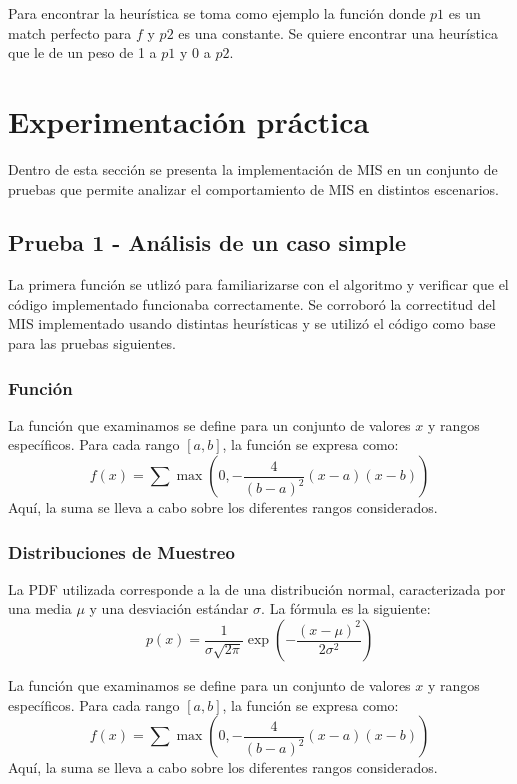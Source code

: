 \documentclass{article}
\begin{document}
Para encontrar la heurística se toma como ejemplo la función donde $p1$ es un match perfecto para $f$ y $p2$ es una constante.
Se quiere encontrar una heurística que le de un peso de 1 a $p1$ y 0 a $p2$.

\section{Experimentación práctica}

Dentro de esta sección se presenta la implementación de MIS en un conjunto de pruebas que permite analizar el comportamiento de MIS en distintos escenarios.

\subsection{Prueba 1 - Análisis de un caso simple}

La primera función se utlizó para familiarizarse con el algoritmo y verificar que el código implementado funcionaba correctamente.
Se corroboró la correctitud del MIS implementado usando distintas heurísticas y se utilizó el código como base para las pruebas siguientes.

\subsubsection*{Función}
La función que examinamos se define para un conjunto de valores \( x \) y rangos específicos. Para cada rango \( [a, b] \), la función se expresa como:
\begin{equation}
f(x) = \sum \max\left(0, -\frac{4}{(b - a)^2} (x - a)(x - b)\right)
\end{equation}
Aquí, la suma se lleva a cabo sobre los diferentes rangos considerados.

\subsubsection*{Distribuciones de Muestreo}
La PDF utilizada corresponde a la de una distribución normal, caracterizada por una media \( \mu \) y una desviación estándar \( \sigma \). La fórmula es la siguiente:
\begin{equation}
p(x) = \frac{1}{\sigma \sqrt{2\pi}} \exp\left(-\frac{(x - \mu)^2}{2\sigma^2}\right)
\end{equation}

La función que examinamos se define para un conjunto de valores \( x \) y rangos específicos. Para cada rango \( [a, b] \), la función se expresa como:
\begin{equation}
f(x) = \sum \max\left(0, -\frac{4}{(b - a)^2} (x - a)(x - b)\right)
\end{equation}
Aquí, la suma se lleva a cabo sobre los diferentes rangos considerados.
\end{document}
